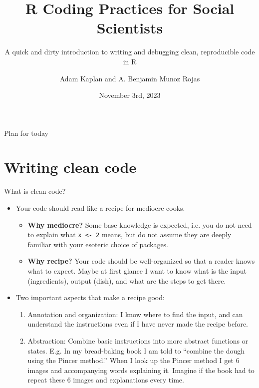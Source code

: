 \documentclass[aspectratio=169,xcolor=dvipsnames]{beamer}
\title[]{R Coding Practices for Social Scientists}
\subtitle{A quick and dirty introduction to writing and debugging clean, reproducible code in R}
\author[]{\large{Adam Kaplan and A. Benjamin Munoz Rojas}}
\institute[]{Massachusetts Institute of Technology}
\date[]{November 3rd, 2023}
\begin{document}
\begin{frame}
    \titlepage
\end{frame}

\begin{frame}{Plan for today}
		\tableofcontents
	\end{frame}


\section{Writing clean code}

\begin{frame}[t]{What is clean code?}
  \begin{itemize}
    \item Your code should read like a recipe for mediocre cooks.\pause
    \begin{itemize}
      \item \textbf{Why mediocre?} \pause Some base knowledge is expected, i.e. you do not need to explain what \texttt{x <- 2} means, but do not assume they are deeply familiar with your esoteric choice of packages. \pause
      \item \textbf{Why recipe?} \pause Your code should be well-organized so that a reader knows what to expect. Maybe at first glance I want to know what is the input (ingredients), output (dish), and what are the steps to get there.
    \end{itemize}\pause
    \item Two important aspects that make a recipe good:\pause
    \begin{enumerate}
      \item \alert{Annotation and organization:} I know where to find the input, and can understand the instructions even if I have never made the recipe before.\pause
      \item \alert{Abstraction:} Combine basic instructions into more abstract functions or states. E.g. In my bread-baking book I am told to ``combine the dough using the Pincer method.'' When I look up the Pincer method I get 6 images and accompanying words explaining it. Imagine if the book had to repeat these 6 images and explanations every time.
    \end{enumerate}
  \end{itemize}
\end{frame}
\end{document}
